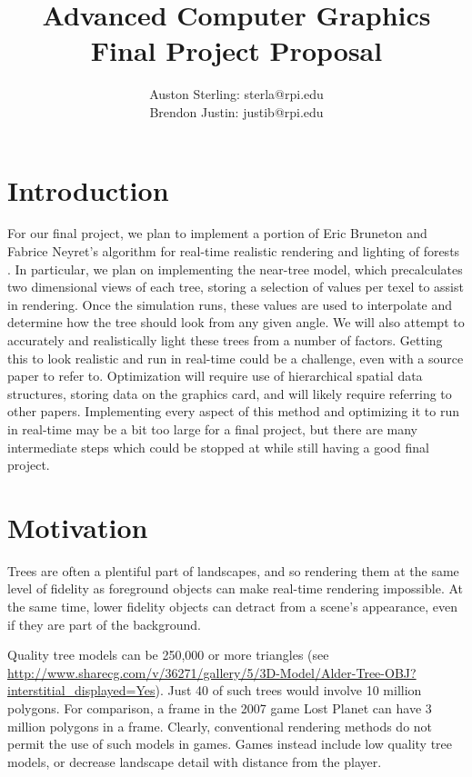 \documentclass{article}
\begin{document}
\title{Advanced Computer Graphics Final Project Proposal}
\author{Auston Sterling: sterla@rpi.edu \\ Brendon Justin: justib@rpi.edu}
\date{}
\maketitle

\section{Introduction}
For our final project, we plan to implement a portion of Eric Bruneton and Fabrice Neyret's algorithm for real-time realistic rendering and lighting of forests \cite{trees}. In particular, we plan on implementing the near-tree model, which precalculates two dimensional views of each tree, storing a selection of values per texel to assist in rendering. Once the simulation runs, these values are used to interpolate and determine how the tree should look from any given angle. We will also attempt to accurately and realistically light these trees from a number of factors. Getting this to look realistic and run in real-time could be a challenge, even with a source paper to refer to. Optimization will require use of hierarchical spatial data structures, storing data on the graphics card, and will likely require referring to other papers. Implementing every aspect of this method and optimizing it to run in real-time may be a bit too large for a final project, but there are many intermediate steps which could be stopped at while still having a good final project.

\section{Motivation}
Trees are often a plentiful part of landscapes, and so rendering them at the same level of fidelity as foreground objects can make real-time rendering impossible.  At the same time, lower fidelity objects can detract from a scene's appearance, even if they are part of the background.  

Quality tree models can be 250,000 or more triangles \cite{???}
(see \url{http://www.sharecg.com/v/36271/gallery/5/3D-Model/Alder-Tree-OBJ?interstitial_displayed=Yes}).  Just 40 of such trees would involve 10 million polygons.  For comparison, a frame in the 2007 game Lost Planet can have 3 million polygons in a frame\cite{many_polygons}.  Clearly, conventional rendering methods do not permit the use of such models in games.  Games instead include low quality tree models, or decrease landscape detail with distance from the player.
\end{document}
